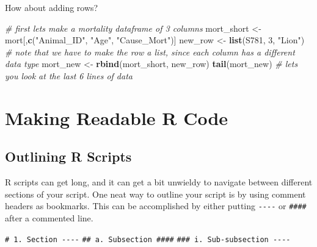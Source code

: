 \documentclass[
]{book}
\newenvironment{Shaded}{\begin{snugshade}}{\end{snugshade}}
\newcommand{\CommentTok}[1]{\textcolor[rgb]{0.56,0.35,0.01}{\textit{#1}}}
\newcommand{\DecValTok}[1]{\textcolor[rgb]{0.00,0.00,0.81}{#1}}
\newcommand{\FunctionTok}[1]{\textcolor[rgb]{0.13,0.29,0.53}{\textbf{#1}}}
\newcommand{\NormalTok}[1]{#1}
\newcommand{\OtherTok}[1]{\textcolor[rgb]{0.56,0.35,0.01}{#1}}
\newcommand{\SpecialCharTok}[1]{\textcolor[rgb]{0.81,0.36,0.00}{\textbf{#1}}}
\newcommand{\StringTok}[1]{\textcolor[rgb]{0.31,0.60,0.02}{#1}}
\begin{document}
\begin{Shaded}
\end{Shaded}

How about adding rows?

\begin{Shaded}
\begin{Highlighting}[]
\CommentTok{\# first let\textquotesingle{}s make a mortality dataframe of 3 columns}
\NormalTok{mort\_short }\OtherTok{\textless{}{-}}\NormalTok{ mort[,}\FunctionTok{c}\NormalTok{(}\StringTok{"Animal\_ID"}\NormalTok{, }\StringTok{"Age"}\NormalTok{, }\StringTok{"Cause\_Mort"}\NormalTok{)]}
\NormalTok{new\_row }\OtherTok{\textless{}{-}} \FunctionTok{list}\NormalTok{(}\StringTok{\textquotesingle{}S781\textquotesingle{}}\NormalTok{, }\DecValTok{3}\NormalTok{, }\StringTok{"Lion"}\NormalTok{) }
\CommentTok{\# note that we have to make the row a list, since each column has a different data type}
\NormalTok{mort\_new }\OtherTok{\textless{}{-}} \FunctionTok{rbind}\NormalTok{(mort\_short, new\_row)}
\FunctionTok{tail}\NormalTok{(mort\_new) }\CommentTok{\# lets you look at the last 6 lines of data}
\end{Highlighting}
\end{Shaded}

\chapter{Making Readable R Code}\label{making-readable-r-code}

\section{Outlining R Scripts}\label{outlining-r-scripts}

R scripts can get long, and it can get a bit unwieldy to navigate between different sections of your script. One neat way to outline your script is by using comment headers as bookmarks. This can be accomplished by either putting \texttt{-\/-\/-\/-} or \texttt{\#\#\#\#} after a commented line.

\texttt{\#\ 1.\ Section\ -\/-\/-\/-}
\texttt{\#\#\ a.\ Subsection\ \#\#\#\#}
\texttt{\#\#\#\ i.\ Sub-subsection\ -\/-\/-\/-}
\end{document}
